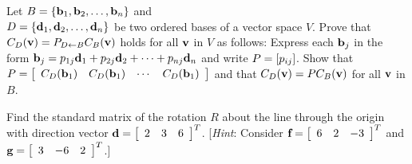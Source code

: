 \begin{multicols}{2}
\begin{ex}
\begin{sol}
\begin{enumerate}[label={\alph*.}]
\end{enumerate}
\end{sol}
\end{ex}

\begin{ex}
Let $B = \{\textbf{b}_{1}, \textbf{b}_{2}, \dots, \textbf{b}_{n}\}$ and\\ $D = \{\textbf{d}_{1}, \textbf{d}_{2}, \dots, \textbf{d}_{n}\}$ be two ordered bases of a vector space $V$. Prove that $C_{D}(\textbf{v}) = P_{D \gets B}C_{B}(\textbf{v})$ holds for all $\textbf{v}$ in $V$ as follows: Express each $\textbf{b}_{j}$ in the form $\textbf{b}_j = p_{1j}\textbf{d}_1 + p_{2j}\textbf{d}_2 + \cdots + p_{nj}\textbf{d}_n$ and write $P = \left[ p_{ij} \right]$. Show that $P = \left[ \begin{array}{cccc} C_D(\textbf{b}_1) & C_D(\textbf{b}_1) & \cdots & C_D(\textbf{b}_1) \end{array} \right]$ and that $C_{D}(\textbf{v}) = PC_{B}(\textbf{v})$ for all $\textbf{v}$ in $B$.
\end{ex}

\begin{ex}
Find the standard matrix of the rotation $R$ about the line through the origin with direction vector $\textbf{d} = \left[ \begin{array}{ccc} 2 & 3 & 6 \end{array} \right]^{T}$. [\textit{Hint}: Consider $\textbf{f} = \left[ \begin{array}{ccc} 6 & 2 & -3 \end{array} \right]^{T}$ and $\textbf{g} = \left[ \begin{array}{ccc} 3 & -6 & 2 \end{array} \right]^{T}$.]
\end{ex}
\end{multicols}
